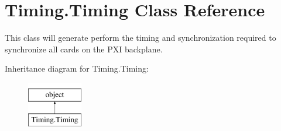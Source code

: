 \hypertarget{class_timing_1_1_timing}{\section{Timing.\-Timing Class Reference}
\label{class_timing_1_1_timing}
}


This class will generate perform the timing and synchronization required to synchronize all cards on the P\-X\-I backplane.  


Inheritance diagram for Timing.\-Timing\-:\begin{figure}[H]
\begin{center}
\leavevmode
\includegraphics[height=2.000000cm]{class_timing_1_1_timing}
\end{center}
\end{figure}
